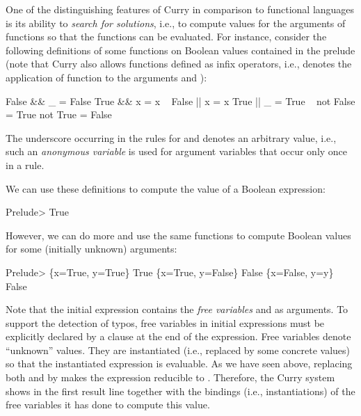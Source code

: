 One of the distinguishing features of Curry in comparison
to functional languages is its ability to \emph{search for solutions},
i.e., to compute values for the arguments of functions so that
the functions can be evaluated.
For instance, consider the following definitions of some functions
on Boolean values contained in the prelude (note that
Curry also allows functions defined as infix operators, i.e.,
 denotes the application of function \code{\&\&}
to the arguments  and ):
\begin{prog}
False \&\& _  =  False
True  \&\& x  =  x
~
False || x  =  x
True  || _  =  True
~
not False   =  True
not True    =  False
\end{prog}
The underscore
\ccode{_}\pindex{_}
occurring in the rules for
\code{\&\&} and \code{||} denotes an arbitrary value,
i.e., such an \emph{anonymous variable} is used for argument
variables that occur only once in a rule.

We can use these definitions to compute the value of a Boolean expression:
\begin{prog}
Prelude> 
True
\end{prog}
However, we can do more and use the same functions
to compute Boolean values for some (initially unknown) arguments:
\begin{prog}
Prelude> 
\{x=True, y=True\} True
\{x=True, y=False\} False
\{x=False, y=y\} False
\end{prog}
Note that the initial expression contains the
\emph{free variables}
 and  as arguments.
To support the detection of typos,
free variables in initial expressions must be explicitly declared
by a  clause at the end of the expression.
Free variables denote ``unknown'' values.
They are instantiated (i.e., replaced by some concrete values) so that
the instantiated expression is evaluable. As we have seen above,
replacing both  and  by 
makes the expression reducible to . Therefore,
the Curry system shows in the first result line  together with the
bindings (i.e., instantiations) of the free variables
it has done to compute this value.


